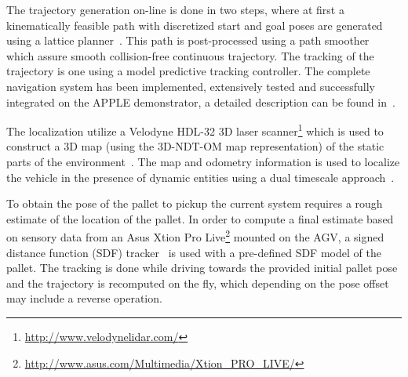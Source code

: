 The trajectory generation on-line is done in two steps, where at first a kinematically feasible path
with discretized start and goal poses are generated using a lattice planner~\cite{Ciri14}. This path
is post-processed using a path smoother~\cite{Andr15} which assure smooth collision-free continuous
trajectory. The tracking of the trajectory is one using a model predictive tracking controller. The
complete navigation system has been implemented, extensively tested and successfully integrated on
the APPLE demonstrator, a detailed description can be found in~\cite{Andr15}.

The localization utilize a Velodyne HDL-32 3D laser
scanner\footnote{\url{http://www.velodynelidar.com/}} which is used to construct a 3D map (using the
3D-NDT-OM map representation) of the static parts of the environment~\cite{Stoy13}. The map and
odometry information is used to localize the vehicle in the presence of dynamic entities using a
dual timescale approach~\cite{Vale14}.

To obtain the pose of the pallet to pickup the current system requires a rough estimate of the
location of the pallet. In order to compute a final estimate based on sensory data from an Asus
Xtion Pro Live\footnote{\url{http://www.asus.com/Multimedia/Xtion_PRO_LIVE/}} mounted on the AGV, a
signed distance function (SDF) tracker~\cite{Cane13} is used with a pre-defined SDF model of the
pallet. The tracking is done while driving towards the provided initial pallet pose and the
trajectory is recomputed on the fly, which depending on the pose offset may include a reverse
operation.
%
